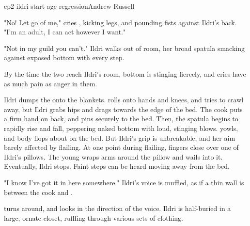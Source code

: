 \documentclass{book}
\begin{document}
\begin{childnode}{ep2 ildri start age regression}{Andrew Russell}

    "No! Let go of me," cries \name{}, kicking \hisher{} legs, and pounding \hisher{} fists against Ildri's back. "I'm an adult, I can act however I want."

    "Not in my guild you can't." Ildri walks out of \names{} room, her broad spatula smacking against \names{} exposed bottom with every step. 

    By the time the two reach Ildri's room, \names{} bottom is stinging fiercely, and \hisher{} cries have as much pain as anger in them.

    Ildri dumps the \boygirl{} onto the blankets. \name{} rolls onto \hisher{} hands and knees, and tries to crawl away, but Ildri grabs \hisher{} hips and drags \himher{} towards the edge of the
    bed. The cook puts a firm hand on \names{} back, and pins \himher{} securely to the bed. Then, the spatula begins to rapidly rise and fall, peppering \names{} naked bottom with loud,
    stinging blows. \name{} yowls, and \hisher{} body flops about on the bed. But Ildri's grip is unbreakable, and her aim barely affected by \names{} flailing. At one point during \hisher{} flailing, \names{} fingers close over one of Ildri's
    pillows. The young \manwoman{} wraps \hisher{} arms around the pillow and wails into it.
    Eventually, Ildri stops. Faint steps can be heard moving away from the bed.


    "I know I've got it in here somewhere." Ildri's voice is muffled, as if a thin wall is between the cook and \name{}.

    \name{} turns around, and looks in the direction of the voice. Ildri is half-buried in a large, ornate closet, ruffling through various sets of clothing.




\end{childnode}
\end{document}

